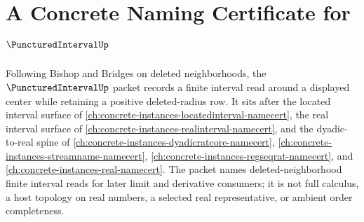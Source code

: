\chapter{A Concrete Naming Certificate for $\PuncturedIntervalUp$}
\label{ch:concrete-instances-punctured-interval-namecert}

Following Bishop and Bridges on deleted neighborhoods, the $\PuncturedIntervalUp$ packet records a finite interval read around a displayed center while retaining a positive deleted-radius row. It sits after the located interval surface of \autoref{ch:concrete-instances-locatedinterval-namecert}, the real interval surface of \autoref{ch:concrete-instances-realinterval-namecert}, and the dyadic-to-real spine of \autoref{ch:concrete-instances-dyadicratcore-namecert}, \autoref{ch:concrete-instances-streamname-namecert}, \autoref{ch:concrete-instances-regseqrat-namecert}, and \autoref{ch:concrete-instances-real-namecert}. The packet names deleted-neighborhood finite interval reads for later limit and derivative consumers; it is not full calculus, a host topology on real numbers, a selected real representative, or ambient order completeness.

